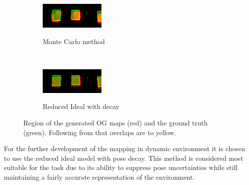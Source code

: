 \begin{figure}[htbp]
	\centering
	\begin{subfigure}[t]{0.45\textwidth}
		\includegraphics[scale=1.5]{figures/static_mapping/color_diff_monte_carlo}		
		\label{fig:monte_carlo_mapsec1}
		\caption{Monte Carlo method}
	\end{subfigure}
	~ %
	\begin{subfigure}[t]{0.45\textwidth}
		\includegraphics[scale=1.5]{figures/static_mapping/color_diff_ideal_decay}
		\label{fig:ideal_deacy_mapsec1}
		\caption{Reduced Ideal with decay}
	\end{subfigure}
	\caption{Region of the generated OG maps (red) and the ground truth (green). Following from that overlaps are to yellow.}
	\label{fig:box_region_comparison}
\end{figure}

For the further development of the mapping in dynamic environment it is chosen to use the reduced ideal model with pose decay. This method is considered most suitable for the task due to its ability to suppress pose uncertainties while still maintaining a fairly accurate representation of the environment. 

